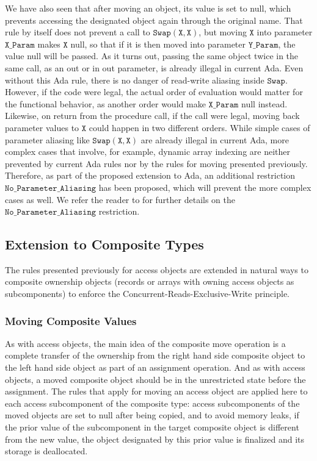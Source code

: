 \documentclass{llncs}
\newcommand\var[1]{\ensuremath{\mathtt{#1}}}
\newcommand{\keyword}[1]{\textsf{#1}}
\begin{document}
We have also seen that after moving an object, its value is set to null, which prevents accessing the designated object again through the original name.
That rule by itself does not prevent a call to \var{Swap(X, X)}, but moving \var{X} into parameter \var{X\_Param} makes \var{X} null, so that if it is then moved into parameter \var{Y\_Param}, the value null will be passed.   As it turns out, passing the same object twice in the same call, as an \keyword{out} or \keyword{in out} parameter, is already illegal in current Ada.
Even without this Ada rule, there is no danger of read-write aliasing inside \var{Swap}. However, if the code were legal, the actual order of evaluation would matter for the functional behavior, as another order would make \var{X\_Param} null
instead. Likewise, on return from the procedure call, if the call were legal, moving back parameter values to \var{X} could happen in two different orders.
While simple cases of parameter aliasing like \var{Swap(X,X)} are already illegal in current Ada, more complex cases that involve, for example, dynamic array indexing are neither
prevented by current Ada rules nor by the rules for moving presented previously. Therefore, as part of the proposed
extension to Ada, an additional restriction \var{No\_Parameter\_Aliasing} has been proposed,
which will prevent the more complex cases as well. We refer the reader to \cite{AI2018} for further details on the \var{No\_Parameter\_Aliasing} restriction.


\subsection{Extension to Composite Types} 
\label{subsec:ownershipComposite}

The rules presented previously for access objects are extended in natural ways to composite ownership objects (records or arrays with owning access objects as subcomponents) to enforce the Concurrent-Reads-Exclusive-Write principle. 

\subsubsection{Moving Composite Values}
\label{subsubsec:movingComposite}

As with access objects, the main idea of the composite move operation is a complete transfer of the ownership from the right hand side composite object to the left hand
side object as part of an assignment operation. And as with access objects, a moved composite object should be in the unrestricted state before the assignment. The rules that apply for moving an
access object are applied here to each access subcomponent of the composite type: access subcomponents of the moved objects are set to null after being copied, and to avoid memory leaks, if the
prior value of the subcomponent in the target composite object is different from the new value, the object designated by this prior value is finalized and its storage is deallocated.  
\end{document}

